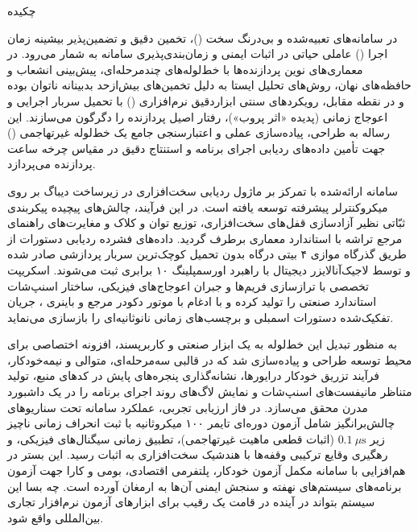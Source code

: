 
\newpage
\thispagestyle{plain}

\begin{center}
    {\titr\Large چکیده}\\[1cm]
\end{center}

\noindent
در سامانه‌های تعبیه‌شده و بی‌درنگ سخت ()، تخمین دقیق و تضمین‌پذیر بیشینه زمان اجرا () عاملی حیاتی در اثبات ایمنی و زمان‌بندی‌پذیری سامانه به شمار می‌رود. در معماری‌های نوین پردازنده‌ها با خط‌لوله‌های چندمرحله‌ای، پیش‌بینی انشعاب و حافظه‌های نهان، روش‌های تحلیل ایستا به دلیل تخمین‌های بیش‌ازحد بدبینانه ناتوان بوده و در نقطه مقابل، رویکردهای سنتی ابزاردقیق نرم‌افزاری () با تحمیل سربار اجرایی و اعوجاج زمانی (پدیده «اثر پروب»)، رفتار اصیل پردازنده را دگرگون می‌سازند. این رساله به طراحی، پیاده‌سازی عملی و اعتبارسنجی جامع یک خط‌لوله غیرتهاجمی () جهت تأمین داده‌های ردیابی اجرای برنامه و استنتاج دقیق  در مقیاس چرخه ساعت پردازنده می‌پردازد.

سامانه ارائه‌شده با تمرکز بر ماژول ردیابی سخت‌افزاری  در زیرساخت دیباگ  بر روی میکروکنترلر پیشرفته  توسعه یافته است. در این فرآیند، چالش‌های پیچیده پیکربندی ثبّاتی نظیر آزادسازی قفل‌های سخت‌افزاری، توزیع توان و کلاک و مغایرت‌های راهنمای مرجع تراشه با استاندارد معماری برطرف گردید. داده‌های فشرده ردیابی دستورات از طریق گذرگاه موازی ۴ بیتی درگاه  بدون تحمیل کوچک‌ترین سربار پردازشی صادر شده و توسط لاجیک‌آنالایزر دیجیتال با راهبرد اورسمپلینگ ۱۰ برابری ثبت می‌شوند. اسکریپت تخصصی  با ترازسازی فریم‌ها و جبران اعوجاج‌های فیزیکی، ساختار اسنپ‌شات استاندارد صنعتی را تولید کرده و با ادغام با موتور دکودر مرجع  و باینری ، جریان تفکیک‌شده دستورات اسمبلی و برچسب‌های زمانی نانوثانیه‌ای را بازسازی می‌نماید. 

به منظور تبدیل این خط‌لوله به یک ابزار صنعتی و کاربرپسند، افزونه اختصاصی  برای محیط توسعه  طراحی و پیاده‌سازی شد که در قالبی سه‌مرحله‌ای، متوالی و نیمه‌خودکار، فرآیند تزریق خودکار درایورها، نشانه‌گذاری پنجره‌های پایش در کدهای منبع، تولید متناظر مانیفست‌های اسنپ‌شات و نمایش لاگ‌های روند اجرای برنامه را در یک داشبورد مدرن محقق می‌سازد. در فاز ارزیابی تجربی، عملکرد سامانه تحت سناریوهای چالش‌برانگیز شامل آزمون دوره‌ای تایمر ۱۰۰ میکروثانیه با ثبت انحراف زمانی ناچیز زیر $0.1\ \mu\mathrm{s}$ (اثبات قطعی ماهیت غیرتهاجمی)، تطبیق زمانی سیگنال‌های فیزیکی، و رهگیری وقایع ترکیبی وقفه‌ها با هندشیک سخت‌افزاری به اثبات رسید. این بستر در هم‌افزایی با سامانه مکمل آزمون خودکار، پلتفرمی اقتصادی، بومی و کارا جهت آزمون برنامه‌های سیستم‌های نهفته و سنجش ایمنی آن‌ها به ارمغان آورده است. چه بسا این سیستم بتواند در آینده در قامت یک رقیب برای ابزارهای آزمون نرم‌افزار تجاری بین‌المللی واقع شود.

